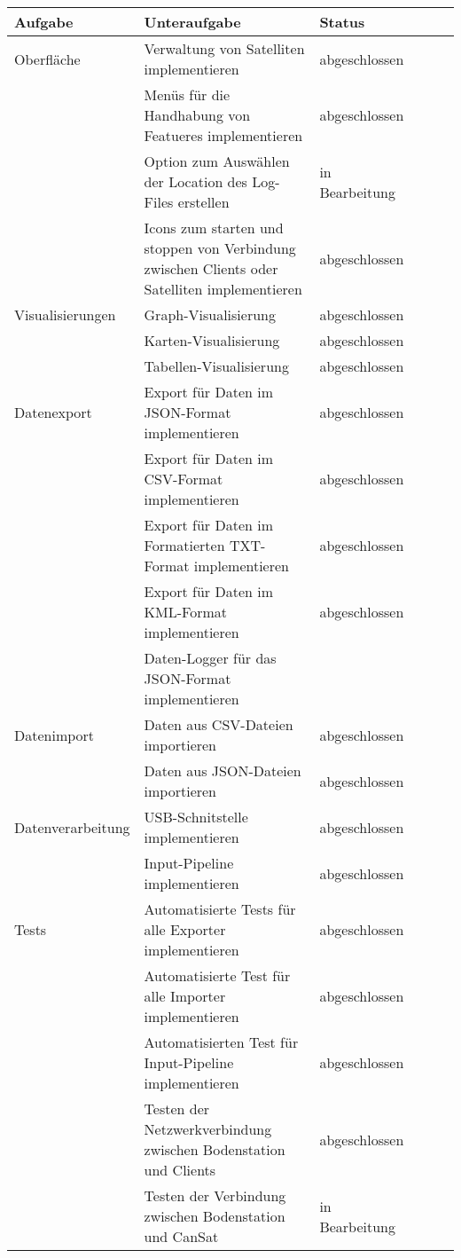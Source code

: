 \begin{table}[H]
  \centering
    \begin{tabular}{p{3cm}p{7cm}p{3cm}rrr}
    \toprule
    \textbf{Aufgabe} & \textbf{Unteraufgabe} & \textbf{Status} \\
	\midrule
	Oberfläche & Verwaltung von Satelliten implementieren & abgeschlossen \\
	& Menüs für die Handhabung von Featueres implementieren & abgeschlossen\\
	& Option zum Auswählen der Location des Log-Files erstellen & in Bearbeitung\\
	& Icons zum starten und stoppen von Verbindung zwischen Clients oder Satelliten implementieren & abgeschlossen \\	
	\midrule
	Visualisierungen & Graph-Visualisierung & abgeschlossen \\
	& Karten-Visualisierung & abgeschlossen \\
	& Tabellen-Visualisierung & abgeschlossen \\
	\midrule
	Datenexport & Export für Daten im JSON-Format implementieren & abgeschlossen \\
	& Export für Daten im CSV-Format implementieren & abgeschlossen \\
	& Export für Daten im Formatierten TXT-Format implementieren & abgeschlossen \\
	& Export für Daten im KML-Format implementieren & abgeschlossen \\
	& Daten-Logger für das JSON-Format implementieren\\
	\midrule
	Datenimport & Daten aus CSV-Dateien importieren & abgeschlossen \\
	& Daten aus JSON-Dateien importieren & abgeschlossen \\
	\midrule
	Datenverarbeitung & USB-Schnitstelle implementieren & abgeschlossen \\
	& Input-Pipeline implementieren & abgeschlossen \\
	\midrule
	Tests & Automatisierte Tests für alle Exporter implementieren & abgeschlossen \\
	& Automatisierte Test für alle Importer implementieren & abgeschlossen \\
	& Automatisierten Test für Input-Pipeline implementieren & abgeschlossen \\
	& Testen der Netzwerkverbindung zwischen Bodenstation und Clients & abgeschlossen \\
	& Testen der Verbindung zwischen Bodenstation und CanSat & in Bearbeitung \\

\end{tabular}
\end{table}
